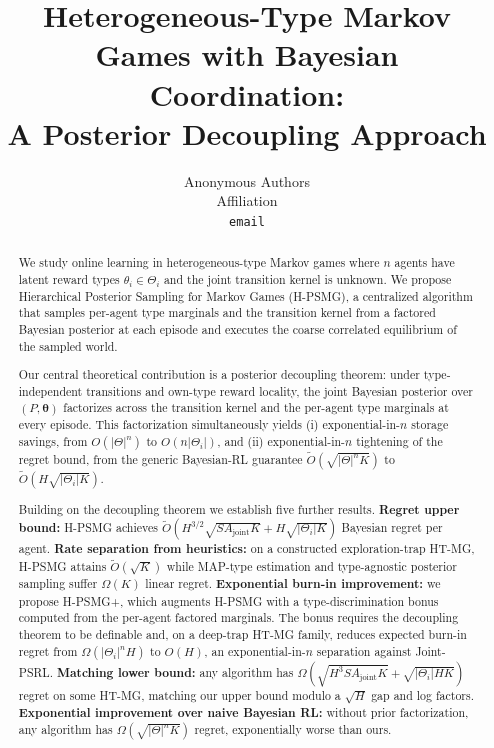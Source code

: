 \documentclass{article}
\title{Heterogeneous-Type Markov Games with Bayesian Coordination:\\
A Posterior Decoupling Approach}
\author{Anonymous Authors\\
Affiliation\\
\texttt{email}}
\def\textsuperscript#1{#1}%
\begin{document}
\maketitle

\begin{abstract}
We study online learning in heterogeneous-type Markov games where $n$ agents have latent reward types $\theta_i \in \Theta_i$ and the joint transition kernel is unknown. We propose Hierarchical Posterior Sampling for Markov Games (H-PSMG), a centralized algorithm that samples per-agent type marginals and the transition kernel from a factored Bayesian posterior at each episode and executes the coarse correlated equilibrium of the sampled world.

Our central theoretical contribution is a posterior decoupling theorem: under type-independent transitions and own-type reward locality, the joint Bayesian posterior over $(P, \boldsymbol{\theta})$ factorizes across the transition kernel and the per-agent type marginals at every episode. This factorization simultaneously yields (i) exponential-in-$n$ storage savings, from $O(|\Theta|^n)$ to $O(n|\Theta_i|)$, and (ii) exponential-in-$n$ tightening of the regret bound, from the generic Bayesian-RL guarantee $\tilde O(\sqrt{|\Theta|^n K})$ to $\tilde O(H \sqrt{|\Theta_i| K})$.

Building on the decoupling theorem we establish five further results. \textbf{Regret upper bound:} H-PSMG achieves $\tilde O(H^{3/2}\sqrt{SA_{\mathrm{joint}}K} + H\sqrt{|\Theta_i| K})$ Bayesian regret per agent. \textbf{Rate separation from heuristics:} on a constructed exploration-trap HT-MG, H-PSMG attains $\tilde O(\sqrt{K})$ while MAP-type estimation and type-agnostic posterior sampling suffer $\Omega(K)$ linear regret. \textbf{Exponential burn-in improvement:} we propose H-PSMG\textsuperscript{+}, which augments H-PSMG with a type-discrimination bonus computed from the per-agent factored marginals. The bonus requires the decoupling theorem to be definable and, on a deep-trap HT-MG family, reduces expected burn-in regret from $\Omega(|\Theta_i|^n H)$ to $O(H)$, an exponential-in-$n$ separation against Joint-PSRL. \textbf{Matching lower bound:} any algorithm has $\Omega(\sqrt{H^3 S A_{\mathrm{joint}} K} + \sqrt{|\Theta_i| HK})$ regret on some HT-MG, matching our upper bound modulo a $\sqrt{H}$ gap and log factors. \textbf{Exponential improvement over naive Bayesian RL:} without prior factorization, any algorithm has $\Omega(\sqrt{|\Theta|^n K})$ regret, exponentially worse than ours.


\end{abstract}
\end{document}
